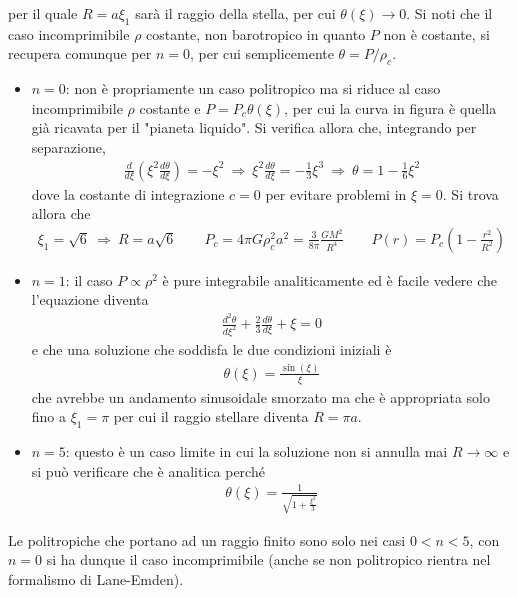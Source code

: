 \documentclass[a4paper, oneside]{book}
\begin{document}
per il quale $R = a\xi_1$ sarà il raggio della stella, per cui $\theta(\xi) \to 0$. Si noti che il 
caso incomprimibile $\rho$ costante, non barotropico in quanto $P$ non è costante, 
si recupera comunque per $n = 0$, per cui semplicemente $\theta = P/\rho_c$. 
\begin{itemize}
    \item $n = 0$: non è propriamente un caso politropico ma si riduce al caso incomprimibile 
    $\rho$ costante e $P = P_c\theta( \xi)$, per cui la curva in figura è quella già ricavata per 
    il "pianeta liquido". Si verifica allora che, integrando per separazione,
    \begin{gather*}
        \frac{d}{d\xi} \left(\xi^2\frac{d\theta}{d\xi}\right) = -\xi^{2} \ \Longrightarrow \ \xi^{2} \frac{d\theta}{d\xi} = -\frac{1}{3}\xi^{3} \ \Longrightarrow \ \theta = 1 - \frac{1}{6}\xi^{2}
    \end{gather*}
    dove la costante di integrazione $c = 0$ per evitare problemi in $\xi = 0$. Si trova allora 
    che 
    \begin{gather*}
        \xi_1 = \sqrt{6} \ \Longrightarrow \ R= a\sqrt{6}  \qquad P_c = 4\pi G \rho_c^{2}a^{2} = \frac{3}{8\pi}\frac{GM^{2}}{R^{4}} \qquad P(r) = P_c\left(1 - \frac{r^{2}}{R^{2}}\right)
    \end{gather*}
    \item $n = 1$: il caso $P\propto \rho^{2}$ è pure integrabile analiticamente ed è facile vedere che 
    l'equazione diventa 
    \begin{gather*}
        \frac{d^{2}\theta}{d\xi^{2}} + \frac{2}{3}\frac{d\theta}{d\xi} + \xi = 0
    \end{gather*}
    e che una soluzione che soddisfa le due condizioni iniziali è 
    \begin{gather*}
        \theta(\xi) = \frac{\sin(\xi)}{\xi}
    \end{gather*}
    che avrebbe un andamento sinusoidale smorzato ma che è appropriata solo fino a $\xi_1 = \pi$ per cui 
    il raggio stellare diventa $R = \pi a$.
    \item $n = 5$: questo è un caso limite in cui la soluzione non si annulla mai
    $R \to \infty $ e si può verificare che è analitica perché 
    \begin{gather*}
        \theta(\xi) = \frac{1}{\sqrt{1 + \frac{\xi^{2}}{3}} }
    \end{gather*}
\end{itemize}
Le politropiche che portano ad un raggio finito sono solo nei casi $0 < n < 5$, con $n = 0$ si ha 
dunque il caso incomprimibile (anche se non politropico rientra nel formalismo di Lane-Emden).
\end{document}
